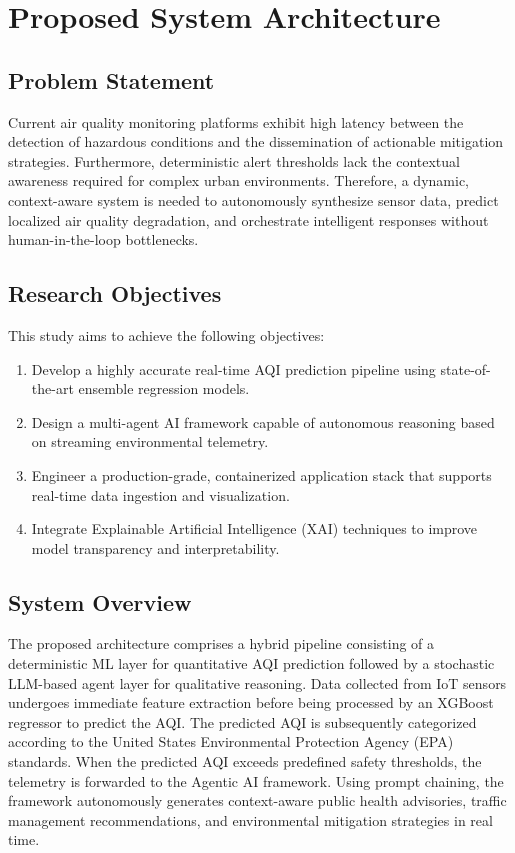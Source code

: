 \documentclass[conference]{IEEEtran}
\begin{document}
\section{Proposed System Architecture}

\subsection{Problem Statement}

Current air quality monitoring platforms exhibit high latency between the detection of hazardous conditions and the dissemination of actionable mitigation strategies. Furthermore, deterministic alert thresholds lack the contextual awareness required for complex urban environments. Therefore, a dynamic, context-aware system is needed to autonomously synthesize sensor data, predict localized air quality degradation, and orchestrate intelligent responses without human-in-the-loop bottlenecks.

\subsection{Research Objectives}

This study aims to achieve the following objectives:

\begin{enumerate}
    \item Develop a highly accurate real-time AQI prediction pipeline using state-of-the-art ensemble regression models.
    \item Design a multi-agent AI framework capable of autonomous reasoning based on streaming environmental telemetry.
    \item Engineer a production-grade, containerized application stack that supports real-time data ingestion and visualization.
    \item Integrate Explainable Artificial Intelligence (XAI) techniques to improve model transparency and interpretability.
\end{enumerate}

\subsection{System Overview}

The proposed architecture comprises a hybrid pipeline consisting of a deterministic ML layer for quantitative AQI prediction followed by a stochastic LLM-based agent layer for qualitative reasoning. Data collected from IoT sensors undergoes immediate feature extraction before being processed by an XGBoost regressor to predict the AQI. The predicted AQI is subsequently categorized according to the United States Environmental Protection Agency (EPA) standards. When the predicted AQI exceeds predefined safety thresholds, the telemetry is forwarded to the Agentic AI framework. Using prompt chaining, the framework autonomously generates context-aware public health advisories, traffic management recommendations, and environmental mitigation strategies in real time.
\end{document}
